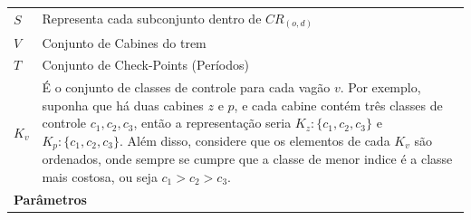 \begin{table}[H]
\begin{tabular}{p{2cm} p{9.5cm} p{3.2cm}}
		$S$                & Representa cada subconjunto dentro de $CR_{(o,d)}$                                                                                                                                                                                                                                                                                                                                                                          &                                              \\
		$V$                & Conjunto de Cabines do trem                                                                                                                                                                                                                                                                                                                                                                                                   &                                              \\
		$T$                & Conjunto de Check-Points (Períodos)                                                                                                                                                                                                                                                                                                                                                                                           &                                              \\
		$K_v$              & \multicolumn{2}{p{12.7cm}}{É o conjunto de classes de controle para cada vagão $v$. Por exemplo, suponha que há duas cabines $z$ e $p$, e cada cabine contém três classes de controle $c_1, c_2, c_3$, então a representação seria $K_z:\{c_1,c_2,c_3\}$ e $K_p:\{c_1,c_2,c_3\}$. Além disso, considere que os elementos de cada $K_v$ são ordenados, onde sempre se cumpre que a classe de menor indice é a classe mais costosa, ou seja $c_1>c_2>c_3$.}                    \\ \midrule
		\multicolumn{3}{l}{\textbf{Parâmetros}}                                                                                                                                                                                                                                                                                                                                                                                                                                                           \\ \midrule

\end{tabular}
\end{table}
